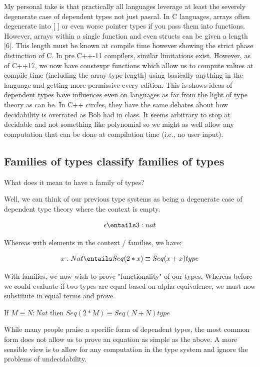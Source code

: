 \documentclass[11pt]{article}
\begin{document}
My personal take is that practically all languages leverage at least the severely degenerate case of dependent types not just pascal. In C languages, arrays often degenerate into [ ] or even worse pointer types if you pass them into functions. However, arrays within a single function and even structs can be given a length [6]. This length must be known at compile time however showing the strict phase distinction of C. In pre C++-11 compilers, similar limitations exist. However, as of C++17, we now have constexpr functions which allow us to compute values at compile time (including the array type length) using basically anything in the language and getting more permissive every edition. This is shows ideas of dependent types have influences even on languages as far from the light of type theory as can be. In C++ circles, they have the same debates about how decidability is overrated as Bob had in class. It seems arbitrary to stop at decidable and not something like polynomial so we might as well allow any computation that can be done at compilation time (i.e., no user input). 

\subsection*{Families of types classify families of types}

What does it mean to have a family of types?

Well, we can think of our previous type systems as being a degenerate case of dependent type theory where the context is empty. 

$$\epsilon \entails 3 : nat$$

Whereas with elements in the context / families, we have:

$$x : Nat \entails Seq(2 * x) \equiv Seq(x + x) type$$

With families, we now wish to prove "functionality" of our types. Whereas before we could evaluate if two types are equal based on alpha-equivalence, we must now substitute in equal terms and prove.

If $M \equiv N : Nat$ then $Seq(2 * M) \equiv Seq(N + N) type$

While many people praise a specific form of dependent types, the most common form does not allow us to prove an equation as simple as the above. A more sensible view is to allow for any computation in the type system and ignore the problems of undecidability.
\end{document}
